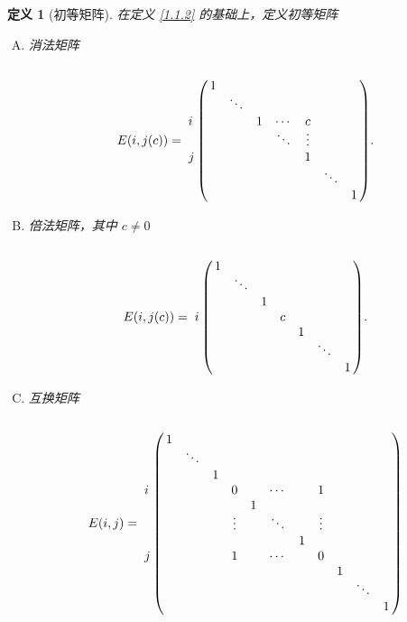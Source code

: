 \documentclass[10pt,openany]{article}
\theoremstyle{thmstyle} %
\theoremstyle{defstyle} %
\newtheorem{definition}[theorem]{定义}
\theoremstyle{prostyle} %
\theoremstyle{exastyle}
\theoremstyle{remstyle}
\begin{document}
\begin{definition}[初等矩阵] 	\label{1.3.3}
	在定义 \ref{1.1.2} 的基础上，定义初等矩阵
	\begin{enumerate}[(A)]
		\item 消法矩阵
		\[ E(i,j(c))=\bordermatrix{
			& & & & & & & \cr
			& 1 & & & & & &  \cr
			& & \ddots & & & & &  \cr
		\textbf{\(i\)}	& & & 1 & \cdots & c & &  \cr
			& & & & \ddots & \vdots & &  \cr
		\textbf{\(j\)}	& & & & & 1 & &  \cr
			& & & & & & \ddots  &  \cr
			& & & & & & & 1 \cr
		}. \]
		\item 倍法矩阵，其中 \( c \neq 0 \)
		\[ E(i,j(c))=\bordermatrix{
			& & & & & & &  \cr
			& 1 & & & &  & &  \cr
			& & \ddots & & &  & &  \cr
			& & & 1 & &  & &  \cr
			\textbf{\(i\)}	& & & & c & & &   \cr
			& &  & & & 1  & &  \cr
			& & & &  & &\ddots &  \cr
			& & & & & & & 1   \cr
		}. \]
		\item 互换矩阵
		\[
		E(i,j) = \bordermatrix{
			&       &       &       &       &       &       &       &       &       &       &       \cr
			& 1     &       &       &       &       &       &       &       &       &       &       \cr
			&       & \ddots&       &       &       &       &       &       &       &       &       \cr
			&       &       & 1     &       &       &       &       &       &       &       &       \cr
			\textbf{\(i\)} &  &       &       & 0     &       & \cdots&       & 1     &       &       &       \cr
			&       &       &       &       & 1     &       &       &       &       &       &       \cr
			&       &       &       & \vdots&       & \ddots&       & \vdots&       &       &       \cr
			&       &       &       &       &       &       & 1     &       &       &       &       \cr
			\textbf{\(j\)} &  &       &       & 1     &       & \cdots&       & 0     &       &       &       \cr
			&       &       &       &       &       &       &       &       & 1     &       &       \cr
			&       &       &       &       &       &       &       &       &       & \ddots&       \cr
			&       &       &       &       &       &       &       &       &       &       & 1     
		}
		\]
		
	\end{enumerate}

\end{definition}
\end{document}
